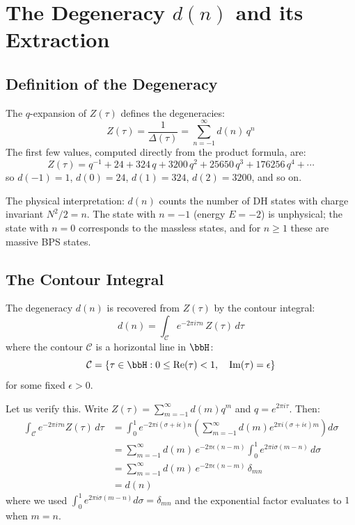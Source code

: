 \section{The Degeneracy $d(n)$ and its Extraction}\label{app:deg}

\subsection{Definition of the Degeneracy}

The $q$-expansion of $Z(\tau)$ defines the degeneracies:
\begin{equation}\label{q-expansion Z}
    Z(\tau) = \frac{1}{\Delta(\tau)} = \sum_{n=-1}^{\infty} d(n)\, q^n
\end{equation}
The first few values, computed directly from the product formula, are:
\begin{equation}
    Z(\tau) = q^{-1} + 24 + 324\,q + 3200\,q^2 + 25650\,q^3 
    + 176256\,q^4 + \cdots
\end{equation}
so $d(-1) = 1$, $d(0) = 24$, $d(1) = 324$, $d(2) = 3200$, and so on.

The physical interpretation: $d(n)$ counts the number of DH states with 
charge invariant $N^2/2 = n$. The state with $n = -1$ (energy $E = -2$) 
is unphysical; the state with $n=0$ corresponds to the massless 
states, and for $n \geq 1$ these are massive BPS states.

\subsection{The Contour Integral}

The degeneracy $d(n)$ is recovered from $Z(\tau)$ by the contour integral:
\begin{equation}\label{contour integral}
    d(n) = \int_{\mathcal{C}} e^{-2\pi i \tau n}\, Z(\tau)\, d\tau
\end{equation}
where the contour $\mathcal{C}$ is a horizontal line in $\bbH$:
\begin{equation}
    \mathcal{C} = \left\{\tau \in \bbH : 0 \leq \operatorname{Re}(\tau) < 1,\quad
    \operatorname{Im}(\tau) = \epsilon \right\}
\end{equation}
for some fixed $\epsilon > 0$.

Let us verify this. Write $Z(\tau) = \sum_{m=-1}^\infty d(m) q^m$ and 
$q = e^{2\pi i\tau}$. Then:
\begin{align}
    \int_{\mathcal{C}} e^{-2\pi i\tau n} Z(\tau)\,d\tau 
    &= \int_0^1 e^{-2\pi i(\sigma+i\epsilon) n} 
    \left(\sum_{m=-1}^\infty d(m) e^{2\pi i(\sigma+i\epsilon)m}\right) d\sigma 
    \nonumber\\
    &= \sum_{m=-1}^\infty d(m)\, e^{-2\pi\epsilon(n-m)} 
    \int_0^1 e^{2\pi i\sigma(m-n)}\,d\sigma \nonumber\\
    &= \sum_{m=-1}^\infty d(m)\, e^{-2\pi\epsilon(n-m)}\,\delta_{mn} \nonumber\\
    &= d(n)
\end{align}
where we used $\int_0^1 e^{2\pi i\sigma(m-n)}d\sigma = \delta_{mn}$ and the 
exponential factor evaluates to $1$ when $m=n$.

